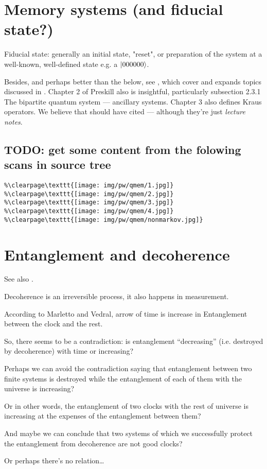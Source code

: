 \section{Memory systems (and fiducial state?)}\label{sec:qmemory}

Fiducial state: generally an initial state, "reset", or
preparation of the system at a well-known, well-defined state
e.g. a $\ket{000000}$.

Besides, and perhaps better than the below, see \cite[Ch.~3]{PreskillNotes},
which cover and expands topics discussed in \cite{open_systems}. Chapter 2
of Preskill \cite{PreskillNotes} also is insightful, particularly
subsection 2.3.1 The bipartite quantum system --- ancillary systems. Chapter 3
also defines Kraus operators. We believe that \cite{Lloyd:Time} should
have cited \cite{PreskillNotes} --- although they're just \emph{lecture notes}.

\subsection{TODO: get some content from the folowing scans in source tree}
\begin{verbatim}
%\clearpage\texttt{[image: img/pw/qmem/1.jpg]}
%\clearpage\texttt{[image: img/pw/qmem/2.jpg]}
%\clearpage\texttt{[image: img/pw/qmem/3.jpg]}
%\clearpage\texttt{[image: img/pw/qmem/4.jpg]}
%\clearpage\texttt{[image: img/pw/qmem/nonmarkov.jpg]}
\end{verbatim}

\section{Entanglement and decoherence}
See also \cite{EntanglementVsDecoherence}.

Decoherence is an irreversible process, it also happens in measurement.

According to Marletto and Vedral, arrow of time is increase in Entanglement
between the clock and the rest.

So, there seems to be a contradiction: is entanglement ``decreasing''
(i.e. destroyed by decoherence) with time
or increasing?

Perhaps we can avoid the contradiction saying that
entanglement between two finite systems is
destroyed while the entanglement of each of them with the universe
is increasing?

Or in other words, the entanglement of two clocks with the rest of universe
is increasing at the expenses of the entanglement between them?

And maybe we can conclude that two systems  of which we successfully
protect the entanglement from decoherence are not good clocks?

Or perhaps there's no relation\dots

\fi
